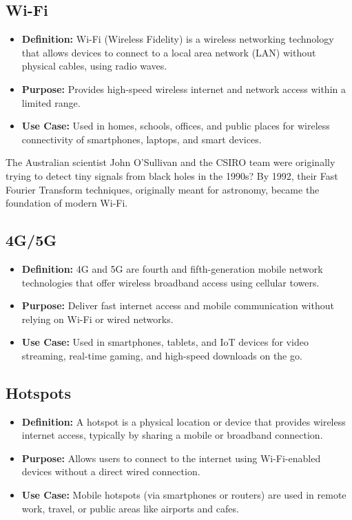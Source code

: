 \subsection{Wi-Fi}
\begin{itemize}[leftmargin=1.5cm]
  \item \textbf{Definition:} Wi-Fi (Wireless Fidelity) is a wireless networking technology that allows devices to connect to a local area network (LAN) without physical cables, using radio waves.
  \item \textbf{Purpose:} Provides high-speed wireless internet and network access within a limited range.
  \item \textbf{Use Case:} Used in homes, schools, offices, and public places for wireless connectivity of smartphones, laptops, and smart devices.
\end{itemize}

\begin{didyouknowbox}
The Australian scientist John O'Sullivan and the CSIRO team were originally trying to detect tiny signals from black holes in the 1990s? By 1992, their Fast Fourier Transform techniques, originally meant for astronomy, became the foundation of modern Wi-Fi.
\end{didyouknowbox}





\subsection{4G/5G}
\begin{itemize}[leftmargin=1.5cm]
  \item \textbf{Definition:} 4G and 5G are fourth and fifth-generation mobile network technologies that offer wireless broadband access using cellular towers.
  \item \textbf{Purpose:} Deliver fast internet access and mobile communication without relying on Wi-Fi or wired networks.
  \item \textbf{Use Case:} Used in smartphones, tablets, and IoT devices for video streaming, real-time gaming, and high-speed downloads on the go.
\end{itemize}

\subsection{Hotspots}
\begin{itemize}[leftmargin=1.5cm]
  \item \textbf{Definition:} A hotspot is a physical location or device that provides wireless internet access, typically by sharing a mobile or broadband connection.
  \item \textbf{Purpose:} Allows users to connect to the internet using Wi-Fi-enabled devices without a direct wired connection.
  \item \textbf{Use Case:} Mobile hotspots (via smartphones or routers) are used in remote work, travel, or public areas like airports and cafes.
\end{itemize}

